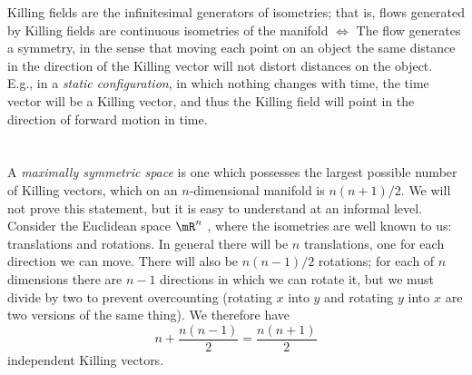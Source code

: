 Killing fields are the infinitesimal generators of isometries; that is, flows generated by Killing fields are continuous isometries of the manifold  $\Leftrightarrow$ The flow generates a symmetry, in the sense that moving each point on an object the same distance in the direction of the Killing vector will not distort distances on the object.\\
E.g., in a \emph{static configuration}, in which nothing changes with time, the time vector will be a Killing vector, and thus the Killing field will point in the direction of forward motion in time.\\
\\
\\
A \emph{maximally symmetric space} is one
which possesses the largest possible number of Killing vectors, which on an $n$-dimensional
manifold is $n(n + 1)/2$. We will not prove this statement, but it is easy to understand at an
informal level. Consider the Euclidean space $\mR^n$ , where the isometries are well known to us:
translations and rotations. In general there will be $n$ translations, one for each direction we
can move. There will also be $n(n − 1)/2$ rotations; for each of $n$ dimensions there are $n − 1$
directions in which we can rotate it, but we must divide by two to prevent overcounting
(rotating $x$ into $y$ and rotating $y$ into $x$ are two versions of the same thing).
We therefore have
\begin{equation}
	n + \frac{n(n-1)}{2} = \frac{n(n+1)}{2}
\end{equation}
independent Killing vectors.
